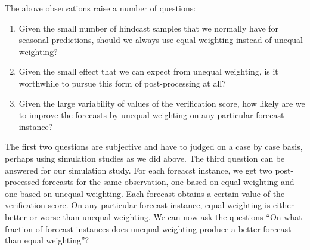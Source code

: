 \documentclass[12pt]{article}
\begin{document}
The above observations raise a number of questions:
\begin{enumerate}
\item Given the small number of hindcast samples that we normally have for seasonal predictions, should we always use equal weighting instead of unequal weighting?

\item Given the small effect that we can expect from unequal weighting, is it worthwhile to pursue this form of post-processing at all?

\item Given the large variability of values of the verification score, how likely are we to improve the forecasts by unequal weighting on any particular forecast instance?
\end{enumerate}

The first two questions are subjective and have to judged on a case by case basis, perhaps using simulation studies as we did above.
The third question can be answered for our simulation study.
For each foreacst instance, we get two post-processed forecasts for the same observation, one based on equal weighting and one based on unequal weighting.
Each forecast obtains a certain value of the verification score.
On any particular forecast instance, equal weighting is either better or worse than unequal weighting.
We can now ask the questions ``On what fraction of forecast instances does unequal weighting produce a better forecast than equal weighting''?
\end{document}
